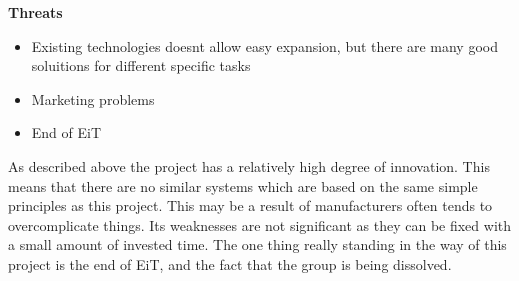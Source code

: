 \textbf{\Large Threats}
\begin{itemize}
	 \item Existing technologies doesnt allow easy expansion, but there are many good soluitions for different specific tasks
	 \item Marketing problems 
     \item End of EiT
\end{itemize}

As described above the project has a relatively high degree of innovation. 
This means that there are no similar systems which are based on the same simple principles as this project. 
This may be a result of manufacturers often tends to overcomplicate things. 
Its weaknesses are not significant as they can be fixed with a small amount of invested time. 
The one thing really standing in the way of this project is the end of EiT, and the fact that the group is being dissolved. 
